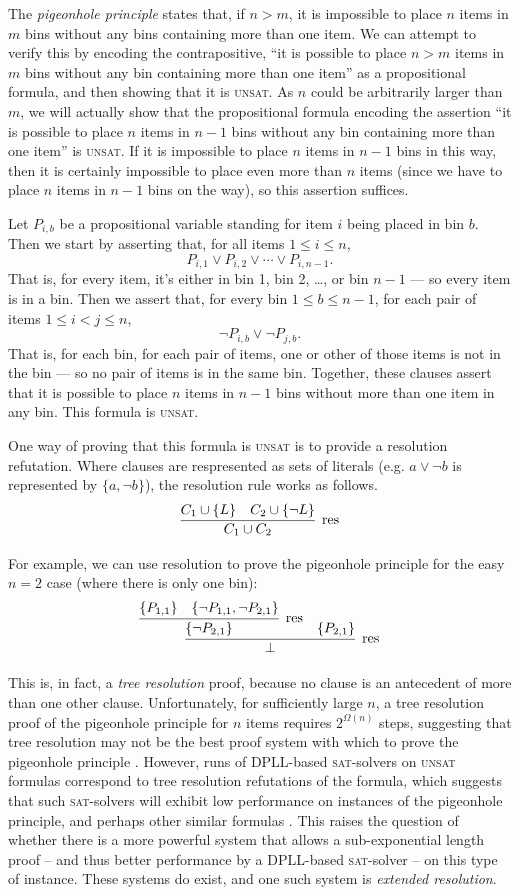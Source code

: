 \documentclass[proof,pdftex,11pt,a4,titlepage]{article}
\newcommand{\sat}{\textsc{sat}}
\newcommand{\unsat}{\textsc{unsat}}
\begin{document}
The \emph{pigeonhole principle} states that, if $n > m$, it is impossible to place $n$ items in $m$ bins without any bins containing more than one item. We can attempt to verify this by encoding the contrapositive, ``it is possible to place $n>m$ items in $m$ bins without any bin containing more than one item'' as a propositional formula, and then showing that it is \unsat. As $n$ could be arbitrarily larger than $m$, we will actually show that the propositional formula encoding the assertion ``it is possible to place $n$ items in $n-1$ bins without any bin containing more than one item'' is \unsat. If it is impossible to place $n$ items in $n-1$ bins in this way, then it is certainly impossible to place even more than $n$ items (since we have to place $n$ items in $n-1$ bins on the way), so this assertion suffices.

Let $P_{i,b}$ be a propositional variable standing for item $i$ being placed in bin $b$. Then we start by asserting that, for all items $1 \leq i \leq n$,
\[P_{i,1} \vee P_{i,2} \vee \cdots \vee P_{i,n-1}.\]
That is, for every item, it's either in bin 1, bin 2, \dots, or bin $n-1$ --- so every item is in a bin. Then we assert that, for every bin $1 \leq b \leq n-1$, for each pair of items $1 \leq i < j \leq n$,
\[\neg P_{i,b} \vee \neg P_{j,b}.\]
That is, for each bin, for each pair of items, one or other of those items is not in the bin --- so no pair of items is in the same bin. Together, these clauses assert that it is possible to place $n$ items in $n-1$ bins without more than one item in any bin. This formula is \unsat.

One way of proving that this formula is \unsat{} is to provide a resolution refutation. Where clauses are respresented as sets of literals (e.g. $a \vee \neg b$ is represented by $\{a, \neg b\}$), the resolution rule works as follows.\[
\infer[\mathrm{res}]{C_1 \cup C_2}{
  C_1 \cup \{L\}
  &
  C_2 \cup \{\neg L\}
}
\]

For example, we can use resolution to prove the pigeonhole principle for the easy $n = 2$ case (where there is only one bin):\[
\infer[\mathrm{res}]{\bot}{
  \infer[\mathrm{res}]{\{\neg P_{2,1}\}}{
    \{P_{1,1}\}
    &
    \{\neg P_{1,1}, \neg P_{2,1}\}
  }
  &
  \{P_{2,1}\}
}
\]

This is, in fact, a \emph{tree resolution} proof, because no clause is an antecedent of more than one other clause. Unfortunately, for sufficiently large $n$, a tree resolution proof of the pigeonhole principle for $n$ items requires $2^{\Omega(n)}$ steps, suggesting that tree resolution may not be the best proof system with which to prove the pigeonhole principle \cite{Haken:1985}.
However, runs of DPLL-based \sat{}-solvers on \unsat{} formulas correspond to tree resolution refutations of the formula, which suggests that such \sat{}-solvers will exhibit low performance on instances of the pigeonhole principle, and perhaps other similar formulas \cite{Rossi:2006}. This raises the question of whether there is a more powerful system that allows a sub-exponential length proof -- and thus better performance by a DPLL-based \sat{}-solver -- on this type of instance. These systems do exist, and one such system is \emph{extended resolution}.
\end{document}
